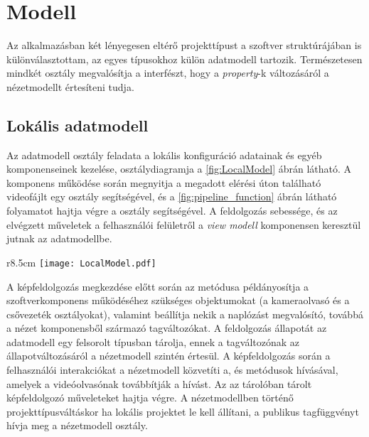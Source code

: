 \section{Modell}

Az alkalmazásban két lényegesen eltérő projekttípust a szoftver struktúrájában is különválasztottam, az egyes típusokhoz külön adatmodell tartozik. Természetesen mindkét osztály megvalósítja a  interfészt, hogy a \emph{property}-k változásáról a nézetmodellt értesíteni tudja. 

\subsection{Lokális adatmodell}

Az adatmodell osztály feladata a lokális konfiguráció adatainak és egyéb komponenseinek kezelése, osztálydiagramja a \ref{fig:LocalModel}  ábrán látható. 
A komponens működése során megnyitja a megadott elérési úton található videofájlt egy  osztály segítségével, és a \ref{fig:pipeline_function} ábrán látható folyamatot hajtja végre a  osztály segítségével. A feldolgozás sebessége, és az elvégzett műveletek a felhasználói felületről a \emph{view modell} komponensen keresztül jutnak az adatmodellbe.

\begin{wrapfigure}{r}{8.5cm}
\texttt{[image: LocalModel.pdf]}
\caption{ osztálydiagram}\label{fig:LocalModel}
\end{wrapfigure} 

A képfeldolgozás megkezdése előtt során az  metódusa példányosítja a szoftverkomponens működéséhez szükséges objektumokat (a kameraolvasó és a csővezeték osztályokat), valamint beállítja nekik a naplózást megvalósító, továbbá a nézet komponensből származó tagváltozókat. A feldolgozás állapotát az adatmodell egy felsorolt típusban tárolja, ennek a tagváltozónak az állapotváltozásáról a nézetmodell szintén értesül. A képfeldolgozás során a felhasználói interakciókat a nézetmodell közvetíti a,  és  metódusok hívásával, amelyek a videóolvasónak továbbítják a hívást. Az  az  tárolóban tárolt képfeldolgozó műveleteket hajtja végre. A nézetmodellben történő projekttípusváltáskor ha lokális projektet le kell állítani, a  publikus tagfüggvényt hívja meg a nézetmodell osztály.

